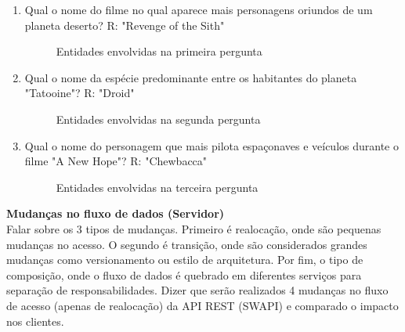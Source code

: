 \begin{enumerate}
\item Qual o nome do filme no qual aparece mais personagens oriundos de um planeta deserto? R: "Revenge of the Sith"

\begin{figure}[H]
  \centering
  \caption{Entidades envolvidas na primeira pergunta}
\end{figure}

\item Qual o nome da espécie predominante entre os habitantes do planeta "Tatooine"? R: "Droid"

\begin{figure}[H]
  \centering
  \caption{Entidades envolvidas na segunda pergunta}
\end{figure}

\item Qual o nome do personagem que mais pilota espaçonaves e veículos durante o filme "A New Hope"? R: "Chewbacca"

\begin{figure}[H]
  \centering
  \caption{Entidades envolvidas na terceira pergunta}
\end{figure}

\end{enumerate}

\textbf{Mudanças no fluxo de dados (Servidor)} \\

Falar sobre os 3 tipos de mudanças. Primeiro é realocação, onde são pequenas mudanças no acesso. O segundo é transição, onde são considerados grandes mudanças como versionamento ou estilo de arquitetura. Por fim, o tipo de composição, onde o fluxo de dados é quebrado em diferentes serviços para separação de responsabilidades. Dizer que serão realizados 4 mudanças no fluxo de acesso (apenas de realocação) da API REST (SWAPI) e comparado o impacto nos clientes.

